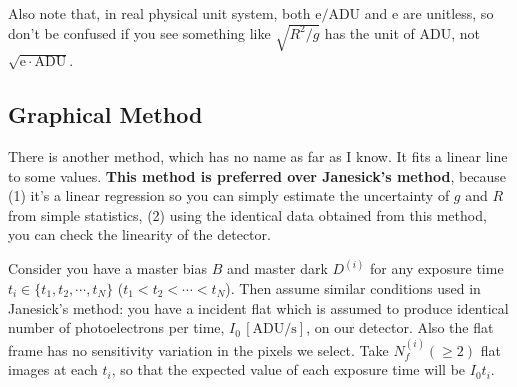 Also note that, in real physical unit system, both $ \mathrm{e/ADU} $ and $ \mathrm{e} $ are unitless, so don't be confused if you see something like $ \sqrt{R^2/g} $ has the unit of ADU, not $ \sqrt{\mathrm{e \cdot ADU}} $.


\subsection{Graphical Method}
There is another method, which has no name as far as I know. It fits a linear line to some values. \textbf{This method is preferred over Janesick's method}, because (1) it's a linear regression so you can simply estimate the uncertainty of $ g $ and $ R $ from simple statistics, (2) using the identical data obtained from this method, you can check the linearity of the detector. 

Consider you have a master bias $ B $ and master dark $ D^{(i)} $ for any exposure time $ t_i \in \{ t_1, t_2, \cdots, t_N \} $ ($ t_1 < t_2 < \cdots < t_N $). Then assume similar conditions used in Janesick's method: you have a incident flat which is assumed to produce identical number of photoelectrons per time, $ I_0 \,\mathrm{[ADU/s]}$, on our detector. Also the flat frame has no sensitivity variation in the pixels we select. Take $ N^{(i)}_f (\ge 2) $ flat images at each $ t_i $, so that the expected value of each exposure time will be $ I_0 t_i $. 

